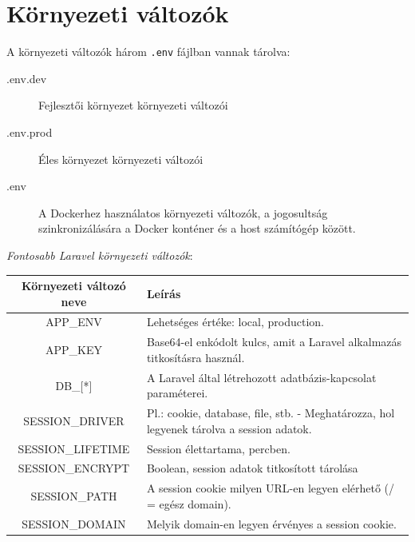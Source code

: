 \section{Környezeti változók}
A környezeti változók három \texttt{.env} fájlban vannak tárolva:
\begin{description}
    \item[.env.dev] Fejlesztői környezet környezeti változói 
    \item[.env.prod] Éles környezet környezeti változói 
    \item[.env] A Dockerhez használatos környezeti változók, a jogosultság szinkronizálására a Docker konténer és a host számítógép között.
\end{description}
\newpage
\begin{center}
    \textit{Fontosabb Laravel környezeti változók}:\\
    \begin{tabular}{|c|l|}
        \hline
        \textbf{Környezeti változó neve} & \textbf{Leírás} \\
        \hline
        APP\_ENV & Lehetséges értéke: local, production. \\
        \hline
        APP\_KEY & Base64-el enkódolt kulcs, amit a Laravel alkalmazás titkosításra használ. \\
        \hline
        DB\_[*] & A Laravel által létrehozott adatbázis-kapcsolat paraméterei. \\
        \hline
        SESSION\_DRIVER & Pl.: cookie, database, file, stb. - Meghatározza, hol legyenek tárolva a session adatok. \\
        \hline
        SESSION\_LIFETIME & Session élettartama, percben. \\
        \hline
        SESSION\_ENCRYPT & Boolean, session adatok titkosított tárolása \\
        \hline
        SESSION\_PATH & A session cookie milyen URL-en legyen elérhető (/ = egész domain). \\
        \hline
        SESSION\_DOMAIN & Melyik domain-en legyen érvényes a session cookie. \\
        \hline
    \end{tabular}
\end{center}

